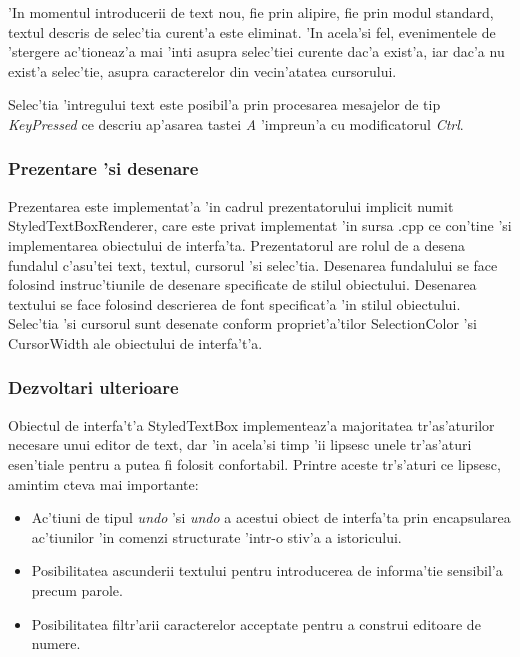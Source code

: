 \medskip

'In momentul introducerii de text nou, fie prin alipire, fie prin modul standard, textul descris de selec'tia curent'a este eliminat. 'In acela'si fel, evenimentele de 'stergere ac'tioneaz'a mai 'int{\ia}i asupra selec'tiei curente dac'a exist'a, iar dac'a nu exist'a selec'tie, asupra caracterelor din vecin'atatea cursorului.

\medskip

Selec'tia 'intregului text este posibil'a prin procesarea mesajelor de tip \emph{KeyPressed} ce descriu ap'asarea tastei \emph{A} 'impreun'a cu modificatorul \emph{Ctrl}.

\subsubsection{Prezentare 'si desenare}

Prezentarea este implementat'a 'in cadrul prezentatorului implicit numit StyledTextBoxRenderer, care este privat implementat 'in sursa .cpp ce con'tine 'si implementarea obiectului de interfa'ta. Prezentatorul are rolul de a desena fundalul c'asu'tei text, textul, cursorul 'si selec'tia. Desenarea fundalului se face folosind instruc'tiunile de desenare specificate de stilul obiectului. Desenarea textului se face folosind descrierea de font specificat'a 'in stilul obiectului. Selec'tia 'si cursorul sunt desenate conform propriet'a'tilor SelectionColor 'si CursorWidth ale obiectului de interfa't'a.

\subsubsection{Dezvoltari ulterioare}

Obiectul de interfa't'a StyledTextBox implementeaz'a majoritatea tr'as'aturilor necesare unui editor de text, dar 'in acela'si timp 'ii lipsesc unele tr'as'aturi esen'tiale pentru a putea fi folosit confortabil. Printre aceste tr's'aturi ce lipsesc, amintim c{\ia}teva mai importante:

\begin{itemize}
\item Ac'tiuni de tipul \emph{undo} 'si \emph{undo} a acestui obiect de interfa'ta prin encapsularea ac'tiunilor 'in comenzi structurate 'intr-o stiv'a a istoricului.
\item Posibilitatea ascunderii textului pentru introducerea de informa'tie sensibil'a precum parole.
\item Posibilitatea filtr'arii caracterelor acceptate pentru a construi editoare de numere.
\end{itemize}

